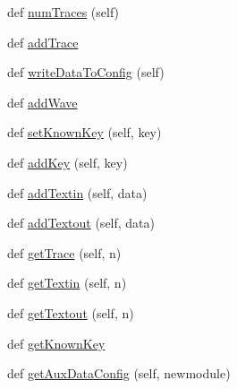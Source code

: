 \begin{DoxyCompactItemize}
\item 
def \hyperlink{classsoftware_1_1chipwhisperer_1_1common_1_1traces_1_1__base_1_1TraceContainer_a8fadd87ab31414b90f8382d97797bcf2}{num\+Traces} (self)
\item 
def \hyperlink{classsoftware_1_1chipwhisperer_1_1common_1_1traces_1_1__base_1_1TraceContainer_a19bd07299c7d265bb4a453fcb962b425}{add\+Trace}
\item 
def \hyperlink{classsoftware_1_1chipwhisperer_1_1common_1_1traces_1_1__base_1_1TraceContainer_a107cff106e7e0bb2d66ac4b2cf26d300}{write\+Data\+To\+Config} (self)
\item 
def \hyperlink{classsoftware_1_1chipwhisperer_1_1common_1_1traces_1_1__base_1_1TraceContainer_ae7bee9f56515ed049e8d96267aee2ab5}{add\+Wave}
\item 
def \hyperlink{classsoftware_1_1chipwhisperer_1_1common_1_1traces_1_1__base_1_1TraceContainer_ad7c418b6e5dc0b3eac7c3742e4960d13}{set\+Known\+Key} (self, key)
\item 
def \hyperlink{classsoftware_1_1chipwhisperer_1_1common_1_1traces_1_1__base_1_1TraceContainer_ac94a9c2d273d935e2c06143ea42965bb}{add\+Key} (self, key)
\item 
def \hyperlink{classsoftware_1_1chipwhisperer_1_1common_1_1traces_1_1__base_1_1TraceContainer_aba781ad864dff0bc73b40e2873afe4f4}{add\+Textin} (self, data)
\item 
def \hyperlink{classsoftware_1_1chipwhisperer_1_1common_1_1traces_1_1__base_1_1TraceContainer_a4085a816e4c77673d7634895d7add080}{add\+Textout} (self, data)
\item 
def \hyperlink{classsoftware_1_1chipwhisperer_1_1common_1_1traces_1_1__base_1_1TraceContainer_a35b13e469c320c272dad9aac43743b9f}{get\+Trace} (self, n)
\item 
def \hyperlink{classsoftware_1_1chipwhisperer_1_1common_1_1traces_1_1__base_1_1TraceContainer_a2bc14fdbc11cf16631872c52a8578d78}{get\+Textin} (self, n)
\item 
def \hyperlink{classsoftware_1_1chipwhisperer_1_1common_1_1traces_1_1__base_1_1TraceContainer_a1963a0bede53fe64b8aabe69330c23fe}{get\+Textout} (self, n)
\item 
def \hyperlink{classsoftware_1_1chipwhisperer_1_1common_1_1traces_1_1__base_1_1TraceContainer_aa4b023b18815c9cdf32025f9fd34a2bc}{get\+Known\+Key}
\item 
def \hyperlink{classsoftware_1_1chipwhisperer_1_1common_1_1traces_1_1__base_1_1TraceContainer_aba9cfe73a6a1316d8327c57f71a34493}{get\+Aux\+Data\+Config} (self, newmodule)
\item 

\end{DoxyCompactItemize}
